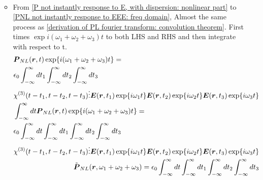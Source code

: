 \documentclass[12pt]{extarticle}
\numberwithin{equation}{section}
\numberwithin{figure}{section}
\numberwithin{table}{section}
\newcommand{\<}{\langle}
\renewcommand{\>}{\rangle}
\theoremstyle{definition}
\begin{document}
\begin{itemize}
\begin{itemize}
\begin{subequations}
\begin{align}
                    \end{align}
                        \label{chi1 fourier transformation}
                    \end{subequations}
                    \item From \autoref{P not instantly response to E, with dispersion: nonlinear part} to \autoref{PNL not instantly response to EEE: freq domain}, Almost the same process as \autoref{derivation of PL fourier transform: convolution theorem}. First times $\exp{i(\omega_1+\omega_2+\omega_3)t}$ to both LHS and RHS and then integrate with respect to t.
                    \begin{subequations}
                    \allowdisplaybreaks
                    \begin{align}
                        \begin{split}
                            &\boldsymbol{P}_{NL}(\boldsymbol{r},t)\exp{i(\omega_1+\omega_2+\omega_3)t}=\\
                            &\epsilon_0\int_{-\infty}^\infty dt_1\int_{-\infty}^\infty dt_2\int_{-\infty}^\infty dt_3 \\
                            &\chi^{(3)}(t-t_1,t-t_2,t-t_3)\vdots \boldsymbol{E}(\boldsymbol{r},t_1)\exp{i\omega_1 t}\boldsymbol{E}(\boldsymbol{r},t_2)\exp{i\omega_2 t}\boldsymbol{E}(\boldsymbol{r},t_3)\exp{i\omega_3 t}
                        \end{split}\\
                        \begin{split}
                            &\int_{-\infty}^\infty dt\boldsymbol{P}_{NL}(\boldsymbol{r},t)\exp{i(\omega_1+\omega_2+\omega_3)t}=\\
                            &\epsilon_0\int_{-\infty}^\infty dt \int_{-\infty}^\infty dt_1\int_{-\infty}^\infty dt_2\int_{-\infty}^\infty dt_3 \\
                            &\chi^{(3)}(t-t_1,t-t_2,t-t_3)\vdots \boldsymbol{E}(\boldsymbol{r},t_1)\exp{i\omega_1 t}\boldsymbol{E}(\boldsymbol{r},t_2)\exp{i\omega_2 t}\boldsymbol{E}(\boldsymbol{r},t_3)\exp{i\omega_3 t}
                        \end{split}\\
                        \begin{split}
                            &\Tilde{\boldsymbol{P}}_{NL}(\boldsymbol{r},\omega_1+\omega_2+\omega_3)=    \epsilon_0\int_{-\infty}^\infty dt \int_{-\infty}^\infty dt_1\int_{-\infty}^\infty dt_2\int_{-\infty}^\infty dt_3 \\

\end{split}
\end{align}
\end{subequations}
\end{itemize}
\end{itemize}
\end{document}
